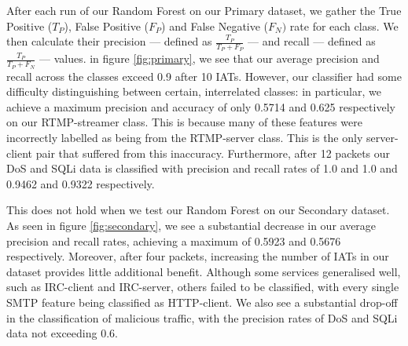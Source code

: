 \documentclass[msc,deptreport, cs]{infthesis} %
\begin{document}
 After each run of our Random Forest on our Primary dataset, we gather the True Positive ($T_{P}$), False Positive ($F_{P}$) and False Negative ($F_{N})$ rate for each class. We then calculate their precision --- defined as $ \frac{T_P}{T_P + F_P}$ --- and recall --- defined as $ \frac{T_P}{T_P + F_N}$ --- values. in figure \ref{fig:primary}, we see that our average precision and recall across the classes exceed 0.9 after 10 IATs. However, our classifier had some difficulty distinguishing between certain, interrelated classes: in particular, we achieve a maximum precision and accuracy of only 0.5714 and 0.625 respectively on our RTMP-streamer class. This is because many of these features were incorrectly labelled as being from the RTMP-server class. This is the only server-client pair that suffered from this inaccuracy. Furthermore, after 12 packets our DoS and SQLi data is classified with precision and recall rates of 1.0 and 1.0 and 0.9462 and 0.9322 respectively.

This does not hold when we test our Random Forest on our Secondary dataset. As seen in figure \ref{fig:secondary}, we see a substantial decrease in our average precision and recall rates, achieving a maximum of 0.5923 and 0.5676 respectively. Moreover, after four packets, increasing the number of IATs in our dataset provides little additional benefit. Although some services generalised well, such as IRC-client and IRC-server, others failed to be classified, with every single SMTP feature being classified as HTTP-client. We also see a substantial drop-off in the classification of malicious traffic, with the precision rates of DoS and SQLi data not exceeding 0.6.
\end{document}
